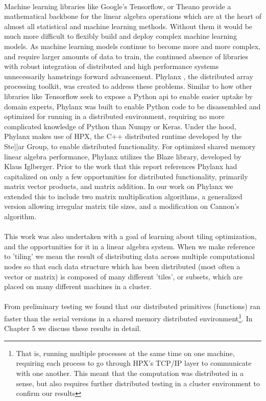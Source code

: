 %

\label{chap:intro}
\paragraph{}
Machine learning libraries like Google's Tensorflow, or Theano provide a mathematical backbone for the linear algebra operations which are at the heart of almost all statistical and machine learning methods. Without them it would be much more difficult to flexibly build and deploy complex machine learning models. As machine learning models continue to become more and more complex, and require larger amounts of data to train, the continued absence of libraries with robust integration of distributed and high performance systems unnecessarily hamstrings forward advancement. Phylanx \cite{Phylanx}, the distributed array processing toolkit, was created to address these problems. Similar to how other libraries like Tensorflow seek to expose a Python api to enable easier uptake by domain experts, Phylanx was built to enable Python code to be disassembled and optimized for running in a distributed environment, requiring no more complicated knowledge of Python than Numpy or Keras. Under the hood, Phylanx makes use of HPX\cite{Heller2017}, the C++ distributed runtime developed by the Ste||ar Group, to enable distributed functionality. For optimized shared memory linear algebra performance, Phylanx utilizes the Blaze library\cite{blaze}, developed by Klaus Iglberger. Prior to the work that this report references Phylanx had capitalized on only a few opportunities for distributed functionality, primarily matrix vector products, and matrix addition. In our work on Phylanx we extended this to include two matrix multiplication algorithms, a generalized version allowing irregular matrix tile sizes, and a modification on Cannon's algorithm.
\paragraph{}
This work was also undertaken with a goal of learning about tiling optimization, and the opportunities for it in a linear algebra system. When we make reference to 'tiling' we mean the result of distributing data across multiple computational nodes so that each data structure which has been distributed (most often a vector or matrix) is composed of many different 'tiles', or subsets, which are placed on many different machines in a cluster.
\paragraph{}
 From preliminary testing we found that our distributed primitives (functions) ran faster than the serial versions in a shared memory distributed environment\footnote{That is, running multiple processes at the same time on one machine, requiring each process to go through HPX's TCP/IP layer to communicate with one another. This meant that the computation was distributed in a sense, but also requires further distributed testing in a cluster environment to confirm our results}. In Chapter 5 we discuss these results in detail.

%
